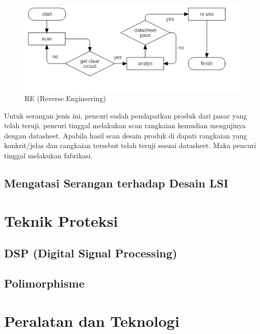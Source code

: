 \begin{figure}
	\centering
	\includegraphics[width=1.05\textwidth]
	{diagrams/reverseEngineering.png}
	\caption{RE (Reverse Engineering)}
	\label{fig:reverseengineering}
\end{figure}

Untuk serangan jenis ini, pencuri sudah pendapatkan produk dari pasar yang telah teruji, pencuri tinggal melakukan scan rangkaian kemudian mengujinya dengan datasheet. Apabila hasil scan desain produk di dapati rangkaian yang konkrit/jelas dan rangkaian tersebut telah teruji sesuai datasheet. Maka pencuri tinggal melakukan fabrikasi.

\subsection{Mengatasi Serangan terhadap Desain LSI}

\section{Teknik Proteksi}

\subsection{DSP (Digital Signal Processing)}

\subsection{Polimorphisme}

\section{Peralatan dan Teknologi}

